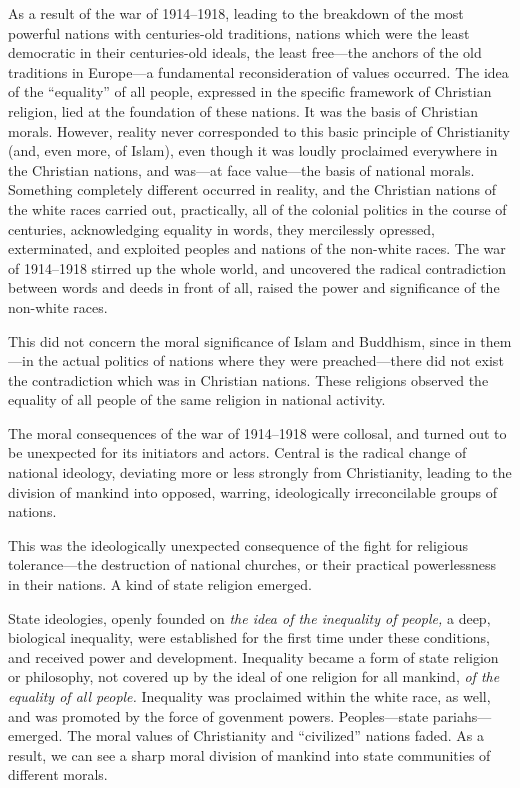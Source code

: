 \Section %
As a result of the war of 1914--1918, leading to the breakdown of the most
powerful nations with centuries-old traditions, nations which were the least
democratic in their centuries-old ideals, the least free---the anchors of the
old traditions in Europe---a fundamental reconsideration of values occurred.
The idea of the ``equality'' of all people, expressed in the specific framework
of Christian religion, lied at the foundation of these nations.  It was the
basis of Christian morals.  However, reality never corresponded to this basic
principle of Christianity (and, even more, of Islam), even though it was loudly
proclaimed everywhere in the Christian nations, and was---at face value---the
basis of national morals.  Something completely different occurred in reality,
and the Christian nations of the white races carried out, practically, all of
the colonial politics in the course of centuries, acknowledging equality in
words, they mercilessly opressed, exterminated, and exploited peoples and
nations of the non-white races.  The war of 1914--1918 stirred up the whole
world, and uncovered the radical contradiction between words and deeds in front
of all, raised the power and significance of the non-white races.

This did not concern the moral significance of Islam and Buddhism, since in
them---in the actual politics of nations where they were preached---there did
not exist the contradiction which was in Christian nations.  These religions
observed the equality of all people of the same religion in national activity.

The moral consequences of the war of 1914--1918 were collosal, and turned out
to be unexpected for its initiators and actors.  Central is the radical change
of national ideology, deviating more or less strongly from Christianity,
leading to the division of mankind into opposed, warring, ideologically
irreconcilable groups of nations.

This was the ideologically unexpected consequence of the fight for religious
tolerance---the destruction of national churches, or their practical
powerlessness in their nations.  A kind of state religion emerged.

State ideologies, openly founded on \emph{the idea of the inequality of
people,} a deep, biological inequality, were established for the first time
under these conditions, and received power and development.  Inequality became
a form of state religion or philosophy, not covered up by the ideal of one
religion for all mankind, \emph{of the equality of all people.}  Inequality was
proclaimed within the white race, as well, and was promoted by the force of
govenment powers.  Peoples---state pariahs---emerged.  The moral values of
Christianity and ``civilized'' nations faded.  As a result, we can see a sharp
moral division of mankind into state communities of different morals.

